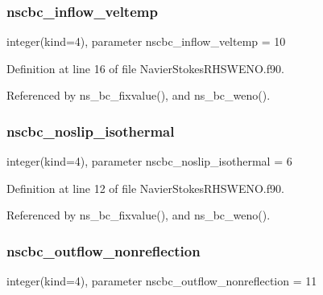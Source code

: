 \subsubsection{\texorpdfstring{nscbc\+\_\+inflow\+\_\+veltemp}{nscbc\_inflow\_veltemp}}
{\footnotesize\ttfamily integer(kind=4), parameter nscbc\+\_\+inflow\+\_\+veltemp = 10}



Definition at line 16 of file Navier\+Stokes\+R\+H\+S\+W\+E\+N\+O.\+f90.



Referenced by ns\+\_\+bc\+\_\+fixvalue(), and ns\+\_\+bc\+\_\+weno().

\hypertarget{namespacenavierstokesrhsweno_acc03638c1b5de1b5efb5bf82d44bab60}{}\label{namespacenavierstokesrhsweno_acc03638c1b5de1b5efb5bf82d44bab60} 
\subsubsection{\texorpdfstring{nscbc\+\_\+noslip\+\_\+isothermal}{nscbc\_noslip\_isothermal}}
{\footnotesize\ttfamily integer(kind=4), parameter nscbc\+\_\+noslip\+\_\+isothermal = 6}



Definition at line 12 of file Navier\+Stokes\+R\+H\+S\+W\+E\+N\+O.\+f90.



Referenced by ns\+\_\+bc\+\_\+fixvalue(), and ns\+\_\+bc\+\_\+weno().

\hypertarget{namespacenavierstokesrhsweno_a44d1aa8c46aa6d879e759954abdbb1f6}{}\label{namespacenavierstokesrhsweno_a44d1aa8c46aa6d879e759954abdbb1f6} 
\subsubsection{\texorpdfstring{nscbc\+\_\+outflow\+\_\+nonreflection}{nscbc\_outflow\_nonreflection}}
{\footnotesize\ttfamily integer(kind=4), parameter nscbc\+\_\+outflow\+\_\+nonreflection = 11}



